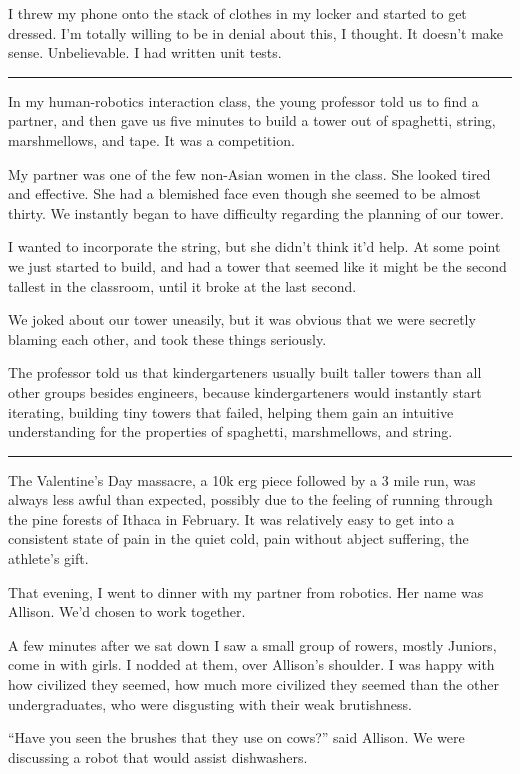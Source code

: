 I threw my phone onto the stack of clothes in my locker and started to get
dressed.  I'm totally willing to be in denial about this, I thought.  It doesn't
make sense.  Unbelievable.  I had written unit tests.

\plainfancybreak{12pt}{2}{* * *}

In my human-robotics interaction class, the young professor told us to find a
partner, and then gave us five minutes to build a tower out of spaghetti,
string, marshmellows, and tape.  It was a competition.

My partner was one of the few non-Asian women in the class.  She looked tired
and effective.  She had a blemished face even though she seemed to be almost
thirty.  We instantly began to have difficulty regarding the planning of our
tower.  

I wanted to incorporate the string, but she didn't think it'd help.  At some
point we just started to build, and had a tower that seemed like it might be the
second tallest in the classroom, until it broke at the last second.

We joked about our tower uneasily, but it was obvious that we were secretly
blaming each other, and took these things seriously.

The professor told us that kindergarteners usually built taller towers than all
other groups besides engineers, because kindergarteners would instantly start
iterating, building tiny towers that failed, helping them gain an intuitive
understanding for the properties of spaghetti, marshmellows, and string. 

\plainfancybreak{12pt}{2}{* * *}

The Valentine's Day massacre, a 10k erg piece followed by a 3 mile run, was
always less awful than expected, possibly due to the feeling of running through
the pine forests of Ithaca in February.  It was relatively easy to get into a
consistent state of pain in the quiet cold, pain without abject suffering, the
athlete's gift. 

That evening, I went to dinner with my partner from robotics.  Her name was
Allison.  We'd chosen to work together.  

A few minutes after we sat down I saw a small group of rowers, mostly Juniors,
come in with girls.  I nodded at them, over Allison's shoulder.  I was happy
with how civilized they seemed, how much more civilized they seemed than the
other undergraduates, who were disgusting with their weak brutishness. 

``Have you seen the brushes that they use on cows?'' said Allison.  We were
discussing a robot that would assist dishwashers.

